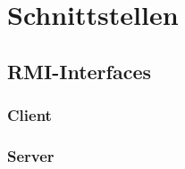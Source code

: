 \section{Schnittstellen} 

\subsection{RMI-Interfaces}

\subsubsection{Client}





\subsubsection{Server}






